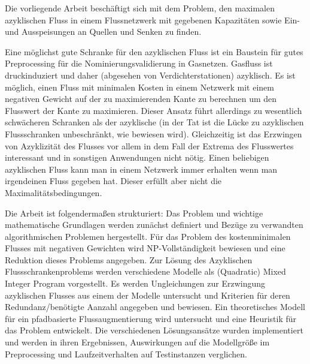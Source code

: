 Die vorliegende Arbeit beschäftigt sich mit dem Problem, den maximalen azyklischen Fluss in einem 
Flussnetzwerk mit gegebenen Kapazitäten sowie Ein- und Ausspeisungen an Quellen und Senken zu finden. 

Eine möglichst gute Schranke für den azyklischen Fluss ist ein Baustein für gutes Preprocessing 
für die Nominierungsvalidierung in Gasnetzen. Gasfluss ist druckinduziert und daher (abgesehen von Verdichterstationen) 
azyklisch. Es ist möglich, einen Fluss mit minimalen Kosten in einem Netzwerk mit einem negativen Gewicht auf der zu 
maximierenden Kante zu berechnen um den Flusswert der Kante zu maximieren. Dieser Ansatz führt allerdings zu wesentlich 
schwächeren Schranken als der azyklische (in der Tat ist die Lücke zu azyklischen Flussschranken unbeschränkt, wie 
bewiesen wird). Gleichzeitig ist das Erzwingen von Azyklizität des Flusses vor allem in dem Fall der Extrema des 
Flusswertes interessant und in sonstigen Anwendungen nicht nötig. Einen beliebigen azyklischen Fluss kann man in einem 
Netzwerk immer erhalten wenn man irgendeinen Fluss gegeben hat. Dieser erfüllt aber nicht die Maximalitätsbedingungen.


Die Arbeit ist folgendermaßen strukturiert: Das Problem und wichtige mathematische Grundlagen werden zunächst definiert 
und Bezüge zu verwandten algorithmischen Problemen hergestellt. 
Für das Problem des kostenminimalen Flusses mit negativen Gewichten wird NP-Vollständigkeit bewiesen und eine Reduktion 
dieses Problems angegeben. 
Zur Lösung des Azyklischen Flussschrankenproblems werden verschiedene Modelle als (Quadratic) 
Mixed Integer Program vorgestellt. Es werden Ungleichungen zur Erzwingung azyklischen Flusses aus einem der Modelle 
untersucht und Kriterien für deren Redundanz/benötigte Aanzahl angegeben und bewiesen. Ein theoretisches Modell für ein 
pfadbasierte Flussaugmentierung wird untersucht und eine Heuristik für das Problem entwickelt.
Die verschiedenen Lösungsansätze wurden implementiert und werden in ihren Ergebnissen, Auswirkungen auf
die Modellgröße im Preprocessing und Laufzeitverhalten auf Testinstanzen verglichen.